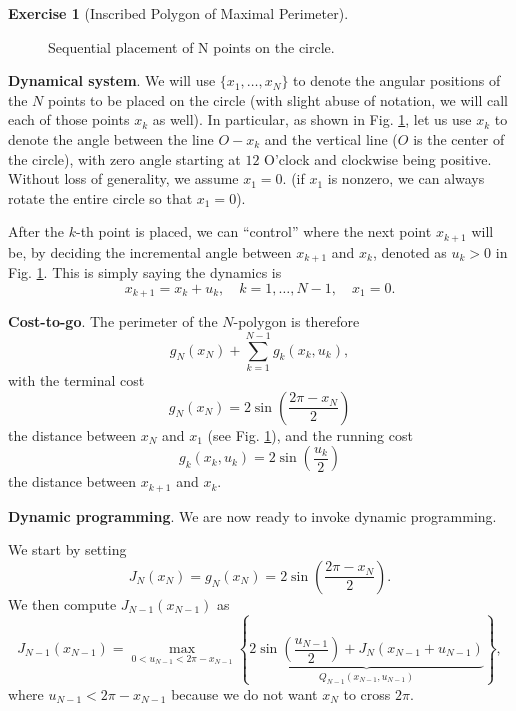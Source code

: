 \documentclass[
]{book}
\theoremstyle{definition}
\theoremstyle{definition}
\theoremstyle{definition}
\newtheorem{exercise}{Exercise}[chapter]
\theoremstyle{definition}
\theoremstyle{remark}
\begin{document}
\begin{exercise}[Inscribed Polygon of Maximal Perimeter]
\begin{figure}
{}

\caption{Sequential placement of N points on the circle.}\label{fig:sequential-placement-N-point}
\end{figure}

\textbf{Dynamical system}. We will use \(\{x_1,\dots,x_N \}\) to denote the angular positions of the \(N\) points to be placed on the circle (with slight abuse of notation, we will call each of those points \(x_k\) as well). In particular,
as shown in Fig. \ref{fig:sequential-placement-N-point}, let us use \(x_k\) to denote the angle between the line \(O-x_k\) and the vertical line (\(O\) is the center of the circle), with zero angle starting at \(12\) O'clock and clockwise being positive. Without loss of generality, we assume \(x_1 = 0\). (if \(x_1\) is nonzero, we can always rotate the entire circle so that \(x_1 = 0\)).

After the \(k\)-th point is placed, we can ``control'' where the next point \(x_{k+1}\) will be, by deciding the incremental angle between \(x_{k+1}\) and \(x_k\), denoted as \(u_k > 0\) in Fig. \ref{fig:sequential-placement-N-point}. This is simply saying the dynamics is
\[
x_{k+1} = x_k + u_k, \quad k=1,\dots,N-1, \quad x_1 = 0.
\]

\textbf{Cost-to-go}. The perimeter of the \(N\)-polygon is therefore
\[
g_N(x_N) + \sum_{k=1}^{N-1} g_k(x_k, u_k),
\]
with the terminal cost
\[
g_N(x_N) = 2 \sin \left(  \frac{2\pi - x_N}{2} \right)
\]
the distance between \(x_N\) and \(x_1\) (see Fig. \ref{fig:sequential-placement-N-point}), and the running cost
\[
g_k(x_k,u_k) = 2 \sin \left(  \frac{u_k}{2} \right)
\]
the distance between \(x_{k+1}\) and \(x_k\).

\textbf{Dynamic programming}. We are now ready to invoke dynamic programming.

We start by setting
\[
J_N(x_N) = g_N(x_N) = 2 \sin \left(  \frac{2\pi - x_N}{2} \right).
\]
We then compute \(J_{N-1}(x_{N-1})\) as
\begin{equation}
J_{N-1}(x_{N-1}) = \max_{0< u_{N-1} < 2\pi - x_{N-1}} \left\{ \underbrace{ 2 \sin \left(  \frac{u_{N-1}}{2} \right) + J_N(x_{N-1} + u_{N-1}) }_{Q_{N-1}(x_{N-1}, u_{N-1})} \right\},
\label{eq:polygon-circle-N-1}
\end{equation}
where \(u_{N-1} < 2\pi - x_{N-1}\) because we do not want \(x_N\) to cross \(2\pi\).


\end{exercise}
\end{document}
